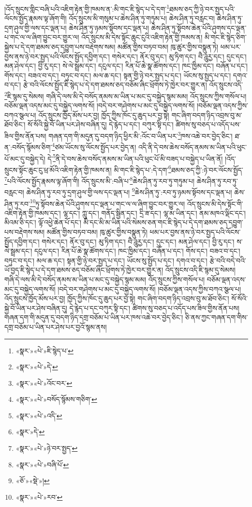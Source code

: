 །འོད་སྲུངས་གླིང་བཞི་པའི་འཇིག་རྟེན་གྱི་ཁམས་ན་:མི་གང་ཇི་སྙེད་པ་དེ་དག་\footnote{«སྣར་»«པེ་»ཇི་སྙེད་པ་}ཐམས་ཅད་ཀྱི་ཉེ་བར་སྤྱད་པའི་ལོངས་སྤྱོད་རྣམས་ལྟ་ཞོག་གི། འོད་སྲུངས་མི་གསུམ་པ་ཆེས་ཤིན་ཏུ་གཏུམ་པ། ཆེས་ཤིན་ཏུ་བརླང་བ། ཆེས་ཤིན་ཏུ་དྲག་ཤུལ་གྱི་ལས་དང་ལྡན་པ། ཆེས་ཤིན་ཏུ་ཉམས་སྟོབས་དང་ལྡན་པ། ཆེས་ཤིན་ཏུ་སྟོབས་ཆེན་པོའི་ཤུགས་དང་ལྡན་པ་གང་ལ་ལ་ཞིག་བྱུང་བར་གྱུར་ལ། འོད་སྲུངས་མི་དེས་སྟོང་ཆུང་ངུའི་འཇིག་རྟེན་གྱི་ཁམས་ན། མི་གང་ཇི་སྙེད་ཅིག་སྐྱེས་པ་དེ་དག་ཐམས་ཅད་དབྱུག་པས་བརྡེགས་སམ། མཚོན་གྱིས་བཏབ་བམ། ཁུ་ཚུར་གྱིས་བསྣུན་ཏེ། ཕམ་པར་བྱས་ནས་ཉེ་བར་སྤྱད་པའི་ལོངས་སྤྱོད་དབྱིག་དང་། གསེར་དང་། ནོར་བུ་དང་། མུ་ཏིག་དང་། བཻ་ཌཱུརྱ་དང་། དུང་དང་། མན་ཤེལ་དང་། བྱི་རུ་དང་། སེ་ལེ་སྦྲམ་དང་། དངུལ་དང་། རིན་པོ་ཆེ་སྣ་ཚོགས་དང་། ཁང་ཁྱིམ་དང་། བཞོན་པ་དང་། གོས་དང་། བཟའ་བ་དང་། བཏུང་བ་དང་། མལ་ཆ་དང་། སྟན་གྱི་ཉེ་བར་སྤྱད་པ་དང་། ཡོངས་སུ་སྤྱད་པ་དང་། དགའ་བ་དང་། རྩེ་བའི་ལོངས་སྤྱོད་ཇི་སྙེད་པ་དེ་དག་ཐམས་ཅད་བཅོམ་ཞིང་ཕྲོགས་ཏེ་ཁྱེར་བར་གྱུར་ན། འོད་སྲུངས་འདི་\footnote{«སྣར་»«པེ་»དེ་}ཇི་སྙམ་དུ་སེམས། གཞི་དེ་ལས་མི་དེ་བསོད་ནམས་མ་ཡིན་པ་མང་དུ་བསྐྱེད་སྙམ་མམ། འོད་སྲུངས་ཀྱིས་གསོལ་པ། བཅོམ་ལྡན་འདས་མང་དུ་བསྐྱེད་ལགས་སོ། །བདེ་བར་གཤེགས་པ་མང་དུ་བསྐྱེད་ལགས་སོ། །བཅོམ་ལྡན་འདས་ཀྱིས་བཀའ་སྩལ་པ། འོད་སྲུངས་ཁྱོད་མོས་པར་བྱ། ཁྱོད་ཀྱིས་ཁོང་དུ་ཆུད་པར་བྱ་སྟེ། གང་ཞིག་བདག་ཉིད་འབྲས་བུ་མ་ཐོབ་ཅིང་། སོ་སོའི་སྐྱེ་བོ་ཡིན་པར་ཤེས་བཞིན་དུ། དེ་རྙེད་པ་དང་། བཀུར་སྟི་དང་། ཚིགས་སུ་བཅད་པ་འདོད་པས་ཟིལ་གྱིས་ནོན་པས། གཞན་དག་གི་མདུན་དུ་བདག་ཉིད་ཕྱིར་མི་:འོང་བ་ཡིན་པར་\footnote{«སྣར་»«པེ་»འོང་བར་}ཁས་འཆེ་བར་བྱེད་ཅིང་། ཐ་ན་:བསོད་སྙོམས་ཅིག་\footnote{«སྣར་»«པེ་»བསོད་སྙོམས་གཅིག་}ཙམ་ཡོངས་སུ་ལོངས་སྤྱོད་པར་བྱེད་ན། འདི་ནི་དེ་བས་ཆེས་བསོད་ནམས་མ་ཡིན་པའི་ཕུང་པོ་མང་དུ་བསྐྱེད་དེ། དེ་\footnote{«སྣར་»«པེ་»འདི་}ནི་དེ་བས་ཆེས་བསོད་ནམས་མ་ཡིན་པའི་ཕུང་པོ་མི་བཟད་པ་བསྐྱེད་པ་ཡིན་ནོ། །འོད་སྲུངས་སྟོང་ཆུང་ངུ་ཕྲ་མོའི་འཇིག་རྟེན་གྱི་ཁམས་ན། མི་གང་ཇི་སྙེད་པ་:དེ་དག་\footnote{«སྣར་»དེ་}ཐམས་ཅད་ཀྱི་:ཉེ་བར་ལོངས་སྤྱོད་\footnote{«སྣར་»«པེ་»ཉེ་བར་སྤྱད་}པའི་ལོངས་སྤྱོད་རྣམས་ལྟ་ཞོག་གི། འོད་སྲུངས་མི་:བཞི་པ་\footnote{«སྣར་»«པེ་»བཞི་པོ་}ཆེས་ཤིན་ཏུ་རབ་ཏུ་གཏུམ་པ། ཆེས་ཤིན་ཏུ་རབ་ཏུ་བརླང་བ། ཆེས་ཤིན་ཏུ་རབ་ཏུ་དྲག་ཤུལ་གྱི་ལས་དང་ལྡན་པ། \footnote{«ཅོ་»«སྡེ་»།}ཆེས་ཤིན་ཏུ་:རབ་ཏུ་ཉམས་སྟོབས་དང་ལྡན་པ། ཆེས་ཤིན་ཏུ་རབ་\footnote{«སྣར་»«པེ་»རབ་}ཏུ་སྟོབས་ཆེན་པོའི་ཤུགས་དང་ལྡན་པ་གང་ལ་ལ་ཞིག་བྱུང་བར་གྱུར་ལ། འོད་སྲུངས་མི་དེས་སྟོང་གི་འཇིག་རྟེན་གྱི་ཁམས་དང་། ལྷ་དང་། ཀླུ་དང་། གནོད་སྦྱིན་དང་། དྲི་ཟ་དང་། ལྷ་མ་ཡིན་དང་། ནམ་མཁའ་ལྡིང་དང་། མིའམ་ཅི་དང་། ལྟོ་འཕྱེ་ཆེན་པོ་དང་། མི་དང་མི་མ་ཡིན་པའི་སེམས་ཅན་གང་ཇི་སྙེད་པ་དེ་དག་ཐམས་ཅད་དབྱུག་པས་བརྡེགས་སམ། མཚོན་གྱིས་བཏབ་བམ། ཁུ་ཚུར་གྱིས་བསྣུན་ཏེ། ཕམ་པར་བྱས་ནས་ཉེ་བར་སྤྱད་པའི་ལོངས་སྤྱོད་དབྱིག་དང་། གསེར་དང་། ནོར་བུ་དང་། མུ་ཏིག་དང་། བཻ་ཌཱུརྱ་དང་། དུང་དང་། མན་ཤེལ་དང་། བྱི་རུ་དང་། ས་ལེ་སྦྲམ་དང་། དངུལ་དང་། རིན་པོ་ཆེ་སྣ་ཚོགས་དང་། ཁང་ཁྱིམ་དང་། བཞོན་པ་དང་། གོས་དང་། བཟའ་བ་དང་། བཏུང་བ་དང་། མལ་ཆ་དང་། སྟན་གྱི་ཉེ་བར་སྤྱད་པ་དང་། ཡོངས་སུ་སྤྱོད་པ་དང་། དགའ་བ་དང་། རྩེ་བའི་བདེ་བའི་ཡོ་བྱད་ཇི་སྙེད་པ་དེ་དག་ཐམས་ཅད་བཅོམ་ཞིང་ཕྲོགས་ཏེ་ཁྱེར་བར་གྱུར་ན། འོད་སྲུངས་འདི་ཇི་སྙམ་དུ་སེམས། གཞི་དེ་ལས་མི་དེ་བསོད་ནམས་མ་ཡིན་པ་མང་དུ་བསྐྱེད་སྙམ་མམ། འོད་སྲུངས་ཀྱིས་གསོལ་པ། བཅོམ་ལྡན་འདས་མང་དུ་བསྐྱེད་ལགས་སོ། །བདེ་བར་གཤེགས་པ་མང་དུ་བསྐྱེད་ལགས་སོ། །བཅོམ་ལྡན་འདས་ཀྱིས་བཀའ་སྩལ་པ། འོད་སྲུངས་ཁྱོད་མོས་པར་བྱ། ཁྱོད་ཀྱིས་ཁོང་དུ་ཆུད་པར་བྱ་སྟེ། གང་ཞིག་བདག་ཉིད་འབྲས་བུ་མ་ཐོབ་ཅིང་། སོ་སོའི་སྐྱེ་བོ་ཡིན་པར་ཤེས་བཞིན་དུ། དེ་རྙེད་པ་དང་བཀུར་སྟི་དང་། ཚིགས་སུ་བཅད་པ་འདོད་པས་ཟིལ་གྱིས་ནོན་པས། གཞན་དག་གི་མདུན་དུ་བདག་ཉིད་དགྲ་བཅོམ་པ་ཡིན་པར་ཁས་འཆེ་བར་བྱེད་ཅིང་། ཅི་ནས་ཀྱང་གཞན་དག་གིས་དགྲ་བཅོམ་པ་ཡིན་པར་ཤེས་པར་བྱའོ་སྙམ་ནས། 